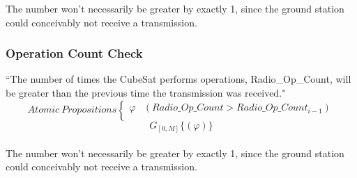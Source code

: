The number won't necessarily be greater by exactly 1, since the ground station could conceivably not receive a transmission.

\subsubsection{\textbf{Operation Count Check}}
“The number of times the CubeSat performs operations, Radio\_Op\_Count, will be greater than the previous time the transmission was received."\\
\[ Atomic\:Propositions \begin{cases}
  \varphi & (Radio\_Op\_Count > Radio\_Op\_Count_{i-1})\\
\end{cases} \]
\begin{equation}
    \label{Spec 1}
    G_{[0,M]} \{(\varphi)\}
\end{equation} \\

The number won't necessarily be greater by exactly 1, since the ground station could conceivably not receive a transmission.

\begin{comment}
\subsubsection{\textbf{Spacecraft Attitude Bounds}}
“The orientation angles X,Y,Z measured by the spacecraft sensors shall be bounded between 0 and 360 degrees in all instances."\\
\[ Atomic\:Propositions \begin{cases}
  \varphi_1 & (X $\geq$ 0) \\
  \varphi_2 & (Y $\geq$ 0) \\
  \varphi_2 & (Z $\geq$ 0) \\
  \psi_1 & (X $\leq$ 360) \\
  \psi_2 & (Y $\leq$ 360) \\
  \psi_2 & (Z $\leq$ 360) \\
\end{cases} \]
\begin{equation}
    \label{Spec 1}
    G_{[0,M]} \{(\varphi_1 \wedge \psi_1) \wedge (\varphi_2 \wedge \psi_2) \wedge (\varphi_3 \wedge \psi_3)\}
\end{equation} \\
\end{comment}